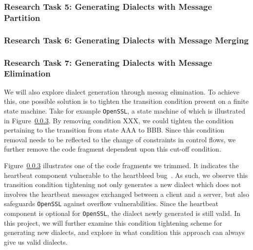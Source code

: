 \subsubsection{Research Task 5: Generating Dialects with Message Partition}

\subsubsection{Research Task 6: Generating Dialects with Message Merging}

\subsubsection{Research Task 7: Generating Dialects with Message Elimination}

We will also explore dialect generation through messag elimination. To achieve this, one possible solution is to tighten the transition condition present on a finite state machine. Take for example \texttt{OpenSSL}, a state machine of which is illustrated in Figure~\ref{}. By removing condition XXX, we could tighten the condition pertaining to the transition from state AAA to BBB. Since this condition removal needs to be reflected to the change of constraints in control flows, we further remove the code fragment dependent upon this cut-off condition. 

Figure~\ref{} illustrates one of the code fragments we trimmed. It indicates the heartbeat component vulnerable to the heartbleed bug~\citep{}. As such, we observe this transition condition tightening not only generates a new dialect which does not involves the heartbeat messages exchanged between a client and a server, but also safeguards \texttt{OpenSSL} against overflow vulnerabilities. Since the heartbeat component is optional for \texttt{OpenSSL}, the dialect newly generated is still valid. In this project, we will further examine this condition tightening scheme for generating new dialects, and explore in what condition this approach can always give us valid dialects. 
